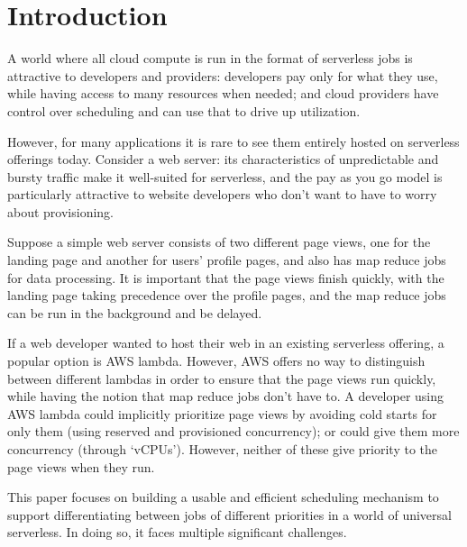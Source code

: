 \section{Introduction}

A world where all cloud compute is run in the format of serverless jobs is
attractive to developers and providers: developers pay only for what they use,
while having access to many resources when needed; and cloud providers have
control over scheduling and can use that to drive up utilization.


However, for many applications it is rare to see them entirely hosted on
serverless offerings today\cite{TODO}. Consider a web server: its
characteristics of unpredictable and bursty traffic make it well-suited for
serverless, and the pay as you go model is particularly attractive to website
developers who don't want to have to worry about provisioning.

Suppose a simple web server consists of two different page views, one for the
landing page and another for users' profile pages, and also has map reduce jobs
for data processing. It is important that the page views finish quickly, with
the landing page taking precedence over the profile pages, and the map reduce
jobs can be run in the background and be delayed.

If a web developer wanted to host their web in an existing serverless offering,
a popular option is AWS lambda\cite{TODO}. However, AWS offers no way to
distinguish between different lambdas in order to ensure that the page views run
quickly, while having the notion that map reduce jobs don't have to. A developer
using AWS lambda could implicitly prioritize page views by avoiding cold starts
for only them (using reserved and provisioned concurrency); or could give them
more concurrency (through `vCPUs'). However, neither of these give priority to
the page views when they run.

This paper focuses on building a usable and efficient scheduling mechanism to
support differentiating between jobs of different priorities in a world of
universal serverless. In doing so, it faces multiple significant challenges.

